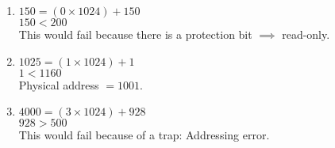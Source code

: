 \documentclass{article}
\begin{document}
\begin{multicols}{2}
    \begin{enumerate}
      \item
        $150 = (0 \times 1024) + 150$ \\
        $150 < 200$ \\
        This would fail because there is a protection bit $\implies$ read-only.
      \item
        $1025 = (1 \times 1024) + 1$ \\
        $1 < 1160$ \\
        Physical address $= 1001$.
      \item
        $4000 = (3 \times 1024) + 928$ \\
        $928 > 500$ \\
        This would fail because of a trap: Addressing error.
    \end{enumerate}
  \end{multicols}
\end{document}
